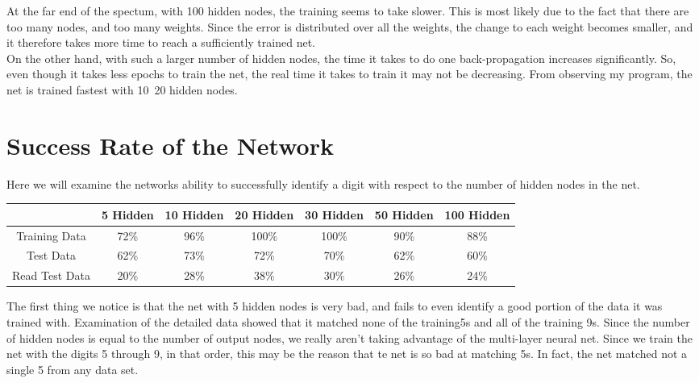 \documentclass[12pt]{article}
\begin{document}
At the far end of the spectum, with 100 hidden nodes, the training seems to take
slower.  This is most likely due to the fact that there are too many nodes, and
too many weights.  Since the error is distributed over all the weights, the
change to each weight becomes smaller, and it therefore takes more time to reach
a sufficiently trained net. \\

On the other hand, with such a larger number of hidden nodes, the time it takes
to do one back-propagation increases significantly.  So, even though it takes
less epochs to train the net, the real time it takes to train it may not be
decreasing.  From observing my program, the net is trained fastest with 10~20
hidden nodes. \\

\section{Success Rate of the Network}
Here we will examine the networks ability to successfully identify a digit with
respect to the number of hidden nodes in the net. \\

\vspace{1em}
\begin{center}
\begin{tabular}{|c|cccccc|}
\hline
& 5 Hidden & 10 Hidden & 20 Hidden & 30 Hidden & 50 Hidden & 100 Hidden \\
\hline
Training Data  & 72\% & 96\% & 100\% & 100\% & 90\% & 88\% \\
Test Data      & 62\% & 73\% &  72\% &  70\% & 62\% & 60\% \\
Read Test Data & 20\% & 28\% &  38\% &  30\% & 26\% & 24\% \\
\hline
\end{tabular}
\end{center}
\vspace{1em}

The first thing we notice is that the net with 5 hidden nodes is very bad, and
fails to even identify a good portion of the data it was trained with.
Examination of the detailed data showed that it matched none of the training5s
and all of the training 9s.  Since the number of hidden nodes is equal to the
number of output nodes, we really aren't taking advantage of the multi-layer
neural net.  Since we train the net with the digits 5 through 9, in that order,
this may be the reason that te net is so bad at matching 5s.  In fact, the net
matched not a single 5 from any data set. \\
\end{document}
